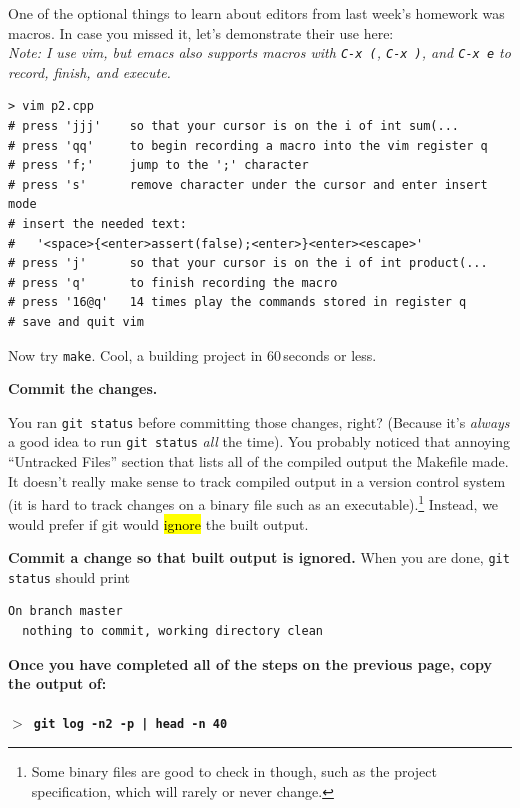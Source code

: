 \documentclass{article}
\begin{document}
\medskip
\noindent
One of the optional things to learn about editors from last week's homework
was macros. In case you missed it, let's demonstrate their use here:\\
{\small \emph{
    Note: I use vim, but emacs also supports macros with \texttt{C-x (},
    \texttt{C-x )}, and \texttt{C-x e} to record, finish, and execute.
}}
\begin{lstlisting}
> vim p2.cpp
# press 'jjj'    so that your cursor is on the i of int sum(...
# press 'qq'     to begin recording a macro into the vim register q
# press 'f;'     jump to the ';' character
# press 's'      remove character under the cursor and enter insert mode
# insert the needed text:
#   '<space>{<enter>assert(false);<enter>}<enter><escape>'
# press 'j'      so that your cursor is on the i of int product(...
# press 'q'      to finish recording the macro
# press '16@q'   14 times play the commands stored in register q
# save and quit vim
\end{lstlisting}
\noindent

\noindent
Now try \texttt{make}. Cool, a building project in 60\,seconds or less.

\medskip
\noindent
\textbf{Commit the changes.}

\medskip
\noindent
You ran \texttt{git status} before committing those changes, right? (Because
it's \emph{always} a good idea to run \texttt{git status} \emph{all} the time).
You probably noticed that annoying ``Untracked Files'' section that
lists all of the compiled output the Makefile made. It doesn't really make
sense to track compiled output in a version control system (it is hard to
track changes on a binary file such as an executable).\footnote{
  Some binary files are good to check in though, such as the project
  specification, which will rarely or never change.
}
Instead, we would prefer if git would \hl{ignore} the built output.

\medskip
\noindent
\textbf{Commit a change so that built output is ignored.} When you are done,
\texttt{git status} should print
\begin{Verbatim}[fontsize=\footnotesize]
  On branch master
  nothing to commit, working directory clean
\end{Verbatim}


\newpage
\textbf{Once you have completed all of the steps on the previous page, copy
the output of:\\
~\\
\texttt{$>$ git log -n2 -p | head -n 40}}
\end{document}
